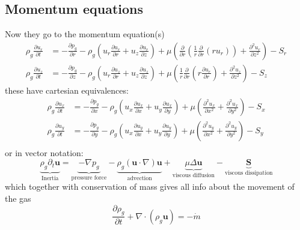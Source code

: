 \documentclass{article}
\begin{document}
\subsection*{Momentum equations}
Now they go to the momentum equation(s)
\begin{align*}
    \rho_g\frac{\partial u_r}{\partial t} &= 
        -\frac{\partial p_g}{\partial r}
        -\rho_g\left( u_r\frac{\partial u_r}{\partial r} +u_z\frac{\partial u_r}{\partial z}\right)
        +\mu \left(
            \frac{\partial }{\partial r} \left( \frac{1}{r}\frac{\partial}{\partial r} (ru_r)\right)
            +\frac{\partial^2 u_r}{\partial z^2}
        \right) 
        - S_r\\
     \rho_g\frac{\partial u_z}{\partial t} &= 
        -\frac{\partial p_g}{\partial z}
        -\rho_g\left( u_r\frac{\partial u_z}{\partial r} +u_z\frac{\partial u_z}{\partial z}\right)
        +\mu \left(
            \frac{1}{r}\frac{\partial }{\partial r} \left( r\frac{\partial u_r}{\partial r} \right)
            +\frac{\partial^2 u_z}{\partial z^2}
        \right) 
        - S_z
\end{align*}
these have cartesian equivalences:
\begin{align*}
    \rho_g\frac{\partial u_x}{\partial t} &= 
        -\frac{\partial p_g}{\partial x}
        -\rho_g\left( u_x\frac{\partial u_x}{\partial x} +u_y\frac{\partial u_x}{\partial y}\right)
        +\mu \left(
            \frac{\partial^2 u_x}{\partial x^2}+\frac{\partial^2 u_x}{\partial y^2}
        \right) 
        - S_x\\
     \rho_g\frac{\partial u_y}{\partial t} &= 
        -\frac{\partial p_g}{\partial y}
        -\rho_g\left( u_x\frac{\partial u_y}{\partial x} +u_y\frac{\partial u_y}{\partial y}\right)
        +\mu \left(
            \frac{\partial^2 u_y}{\partial x^2}+\frac{\partial^2 u_y}{\partial y^2}
        \right) 
        - S_y\\
\end{align*}
or in vector notation:
\begin{equation}\label{eq:compressible_navier}
    \underbrace{\rho_g \partial_t \mathbf{u}}_{\text{Inertia}}=
    \underbrace{-\nabla p_g}_{\text{pressure force}} 
    -\underbrace{\rho_g (\mathbf{u}\cdot \nabla)\mathbf{u}}_{\text{advection}}+ 
    \underbrace{\mu \Delta \mathbf{u}}_{\text{viscous diffusion}}  - 
    \underbrace{\mathbf{S}}_{\text{viscous dissipation}}
\end{equation}
which together with conservation of mass gives all info about the movement of the gas
\begin{equation}\label{eq:conservation_off_mass}
    \frac{\partial \rho_g}{\partial t}+\nabla \cdot (\rho_g \mathbf{u}) = -\dot m
\end{equation}
\end{document}
